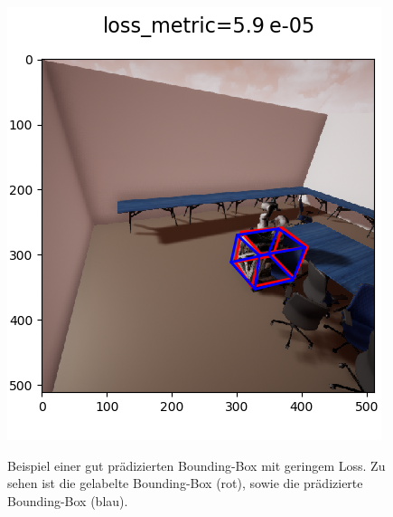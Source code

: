 \begin{figure}[!htb]
   \begin{minipage}[b]{.5\linewidth} %
      \includegraphics[width=\linewidth]{bbs/gut.png}  
      \label{tiv_ausgang}    
      \caption{Beispiel einer gut prädizierten Bounding-Box mit geringem Loss. Zu sehen ist die gelabelte Bounding-Box (rot), sowie die prädizierte Bounding-Box (blau).}
   \end{minipage}
   \hspace{.03\linewidth}%
   \begin{minipage}[b]{.5\linewidth} %

\end{minipage}
\end{figure}
